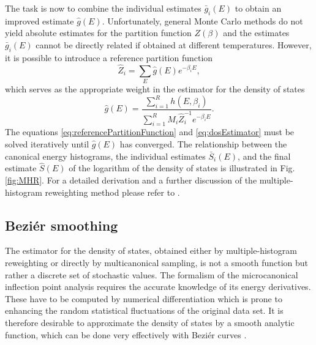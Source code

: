 \documentclass[12pt]{report}
\begin{document}
The task is now to combine the individual estimates $\bar{g}_{i}(E)$ to obtain an improved estimate $\hat{g}(E)$. Unfortunately, general Monte Carlo methods do not yield absolute estimates for the partition function $Z(\beta)$ and the estimates $\bar{g}_{i}(E)$ cannot be directly related if obtained at different temperatures.
However, it is possible to introduce a reference partition function
%
\begin{equation}
\label{eq:referencePartitionFunction}
\hat{Z}_i = \sum_E \hat{g}(E) e^{-\beta_i E},
\end{equation}
%
which serves as the appropriate weight in the estimator for the density of states
\begin{equation}
\label{eq:dosEstimator}
\hat{g}(E)= \frac{\sum_{i=1}^{R} h(E,\beta _{i})}{\sum_{i=1}^{R} M_i
\hat{Z}_i^{-1} e^{-\beta_i E}}.
\end{equation}
%
The equations \ref{eq:referencePartitionFunction} and \ref{eq:dosEstimator} must be solved iteratively until $\hat{g}(E)$ has converged. The relationship between the canonical energy histograms, the individual estimates $\bar{S}_{i}(E)$, and the final estimate $\hat{S}(E)$ of the logarithm of the density of states is illustrated in Fig. \ref{fig:MHR}. For a detailed derivation and a further discussion of the multiple-histogram reweighting method please refer to \cite{Ferrenberg1989,Kumar1992}.

\subsection{Bezi\'{e}r smoothing}
The estimator for the density of states, obtained either by multiple-histogram reweighting or directly by multicanonical sampling, is not a smooth function but rather a discrete set of stochastic values. The formalism of the microcanonical inflection point analysis requires the accurate knowledge of its energy derivatives. These have to be computed by numerical differentiation which is prone to enhancing the random statistical fluctuations of the original data set. It is therefore desirable to approximate the density of states by a smooth analytic function, which can be done very effectively with Bezi\'{e}r curves \cite{Bachmann2014, Bezier1968}.
\end{document}
